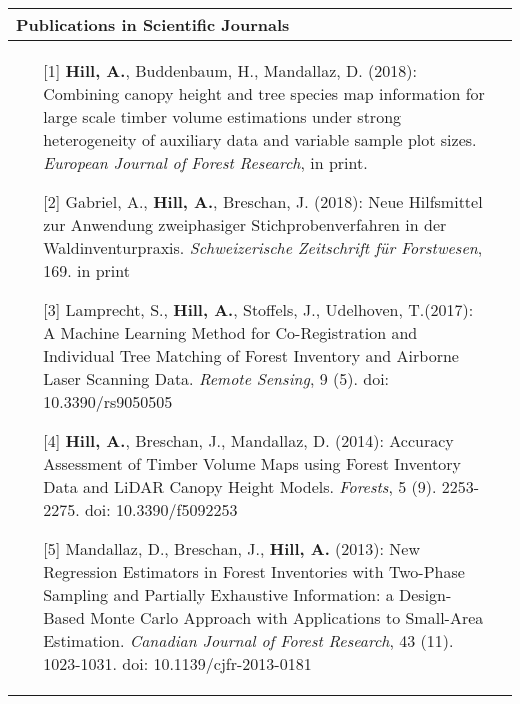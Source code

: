 \noindent
\begin{tabular*}{\textwidth}{p{}p{}}
	\multicolumn{2}{l}{\large Publications in Scientific Journals}\\
	\toprule
\begin{enumerate}[]
	
		\item [{[1]}] \textbf{Hill, A.}, Buddenbaum, H., Mandallaz, D. (2018): Combining canopy height and tree species map information for large scale timber volume estimations under strong heterogeneity of auxiliary data and variable sample plot sizes. \textit{European Journal of Forest Research}, in print.
	
	 	\item [{[2]}] Gabriel, A., \textbf{Hill, A.}, Breschan, J. (2018): Neue Hilfsmittel zur Anwendung zweiphasiger Stichprobenverfahren in der Waldinventurpraxis. \textit{Schweizerische Zeitschrift f{\"u}r Forstwesen}, 169. in print
	
		\item [{[3]}] Lamprecht, S., \textbf{Hill, A.}, Stoffels, J., Udelhoven, T.(2017): A Machine Learning Method for Co-Registration and Individual Tree Matching of Forest Inventory and Airborne Laser Scanning Data. \textit{Remote Sensing}, 9 (5). doi: 10.3390/rs9050505
		
		\item [{[4]}] \textbf{Hill, A.}, Breschan, J., Mandallaz, D. (2014): Accuracy Assessment of Timber Volume Maps using Forest Inventory Data and LiDAR Canopy Height Models. \textit{Forests}, 5 (9). 2253-2275. doi: 10.3390/f5092253
			
		\item [{[5]}] Mandallaz, D., Breschan, J., \textbf{Hill, A.} (2013): New Regression Estimators in Forest Inventories with Two-Phase Sampling and Partially Exhaustive Information: a Design-Based Monte Carlo Approach with Applications to Small-Area Estimation. \textit{Canadian Journal of Forest Research}, 43 (11). 1023-1031. doi: 10.1139/cjfr-2013-0181
	
\end{enumerate}
	&\\
\end{tabular*}


